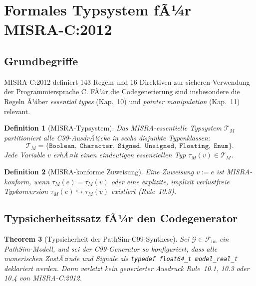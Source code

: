 ﻿\documentclass[12pt,a4paper]{article}
\newtheorem{theorem}{Theorem}[section]
\newtheorem{definition}[theorem]{Definition}
\theoremstyle{definition}
\begin{document}
\section{Formales Typsystem fÃ¼r MISRA-C:2012}
\label{sec:misra}


\subsection{Grundbegriffe}

MISRA-C:2012 \cite{misra2012} definiert 143 Regeln und 16 Direktiven zur
sicheren Verwendung der Programmiersprache C. FÃ¼r die Codegenerierung sind
insbesondere die Regeln Ã¼ber \emph{essential types} (Kap.~10) und
\emph{pointer manipulation} (Kap.~11) relevant.

\begin{definition}[MISRA-Typsystem]
\label{def:misra-types}
Das \emph{MISRA-essentielle Typsystem} $\mathcal{T}_M$ partitioniert alle
C99-AusdrÃ¼cke in sechs disjunkte Typenklassen:
\[
  \mathcal{T}_M = \{\texttt{Boolean},\; \texttt{Character},\; \texttt{Signed},\;
  \texttt{Unsigned},\; \texttt{Floating},\; \texttt{Enum}\}.
\]
Jede Variable $v$ erhÃ¤lt einen eindeutigen essenziellen Typ
$\tau_M(v) \in \mathcal{T}_M$.
\end{definition}

\begin{definition}[MISRA-konforme Zuweisung]
\label{def:misra-assign}
Eine Zuweisung $v := e$ ist \emph{MISRA-konform}, wenn
$\tau_M(e) = \tau_M(v)$ oder eine explizite, implizit verlustfreie
Typkonversion $\tau_M(e) \hookrightarrow \tau_M(v)$ existiert (Rule~10.3).
\end{definition}

\subsection{Typsicherheitssatz fÃ¼r den Codegenerator}

\begin{theorem}[Typsicherheit der PathSim-C99-Synthese]
\label{thm:typesafe}
Sei $\mathcal{G} \in \mathcal{F}_{\mathrm{lin}}$ ein PathSim-Modell, und sei
der C99-Generator so konfiguriert, dass alle numerischen ZustÃ¤nde und Signale
als \texttt{typedef float64\_t model\_real\_t} deklariert werden. Dann verletzt
kein generierter Ausdruck Rule~10.1, 10.3 oder 10.4 von MISRA-C:2012.
\end{theorem}
\end{document}
